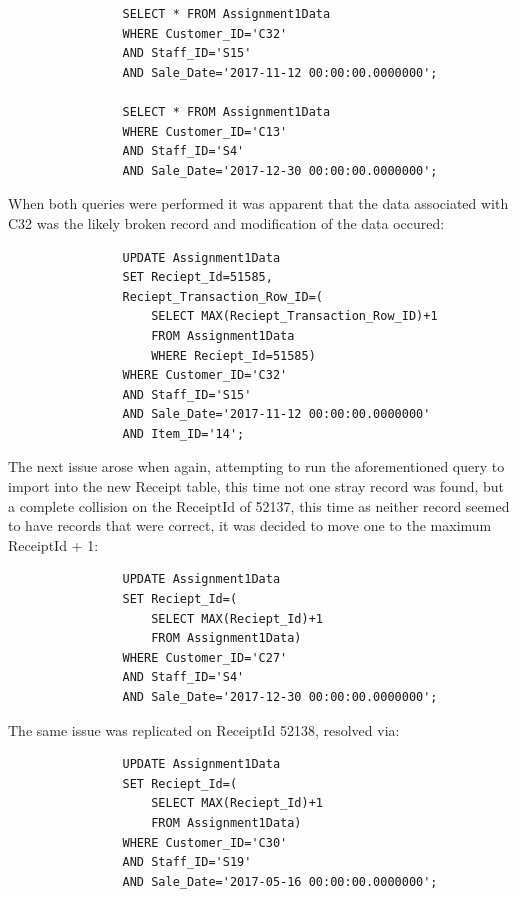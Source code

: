 \documentclass{article}
\begin{document}
            \begin{lstlisting}
                SELECT * FROM Assignment1Data 
                WHERE Customer_ID='C32' 
                AND Staff_ID='S15' 
                AND Sale_Date='2017-11-12 00:00:00.0000000';
            
                SELECT * FROM Assignment1Data 
                WHERE Customer_ID='C13' 
                AND Staff_ID='S4' 
                AND Sale_Date='2017-12-30 00:00:00.0000000';
            \end{lstlisting}

            When both queries were performed it was apparent that the data associated with C32 was 
            the likely broken record and modification of the data occured:

            \begin{lstlisting}
                UPDATE Assignment1Data 
                SET Reciept_Id=51585, 
                Reciept_Transaction_Row_ID=(
                    SELECT MAX(Reciept_Transaction_Row_ID)+1 
                    FROM Assignment1Data
                    WHERE Reciept_Id=51585)
                WHERE Customer_ID='C32' 
                AND Staff_ID='S15' 
                AND Sale_Date='2017-11-12 00:00:00.0000000' 
                AND Item_ID='14';
            \end{lstlisting}

            The next issue arose when again, attempting to run the aforementioned query to import
            into the new Receipt table, this time not one stray record was found, but a complete
            collision on the ReceiptId of 52137, this time as neither record seemed to have 
            records that were correct, it was decided to move one to the maximum ReceiptId + 1:

            \begin{lstlisting}
                UPDATE Assignment1Data 
                SET Reciept_Id=(
                    SELECT MAX(Reciept_Id)+1 
                    FROM Assignment1Data) 
                WHERE Customer_ID='C27' 
                AND Staff_ID='S4' 
                AND Sale_Date='2017-12-30 00:00:00.0000000';
            \end{lstlisting}

            The same issue was replicated on ReceiptId 52138, resolved via:

            \begin{lstlisting}
                UPDATE Assignment1Data 
                SET Reciept_Id=(
                    SELECT MAX(Reciept_Id)+1 
                    FROM Assignment1Data) 
                WHERE Customer_ID='C30' 
                AND Staff_ID='S19' 
                AND Sale_Date='2017-05-16 00:00:00.0000000';
            \end{lstlisting}
\end{document}
